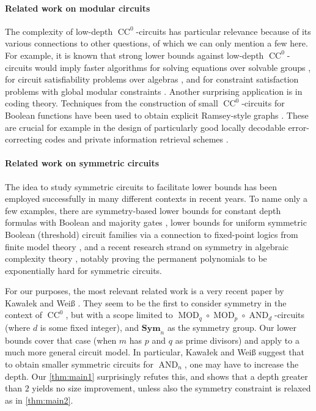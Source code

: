 \documentclass[11pt]{article}
\DeclareMathOperator{\MOD}{MOD}
\DeclareMathOperator{\AND}{AND}
\newcommand{\Sym}{\mathbf{Sym}}
\theoremstyle{definition}
\theoremstyle{plain}
\theoremstyle{remark}
\theoremstyle{remark}
\DeclareMathOperator{\CC}{CC}
\begin{document}
 







\paragraph*{Related work on modular circuits }
The complexity of low-depth $\CC^0$-circuits has particular relevance because of its various connections to other questions, of which we can only mention a few here.
For example, it is known that strong lower bounds against low-depth $\CC^0$-circuits would imply faster algorithms for solving equations over solvable groups \cite{IdziakKKW22-icalp}, for circuit satisfiability problems over algebras \cite{IdziakKK20, IdziakKK25}, and for constraint satisfaction problems with global modular constraints \cite{brakensiek2022}.
Another surprising application is in coding theory. Techniques from the construction of small $\CC^0$-circuits for Boolean functions have been used to obtain explicit Ramsey-style graphs \cite{Gopalan14, grolmusz2000}. These are crucial for example in the design of particularly good locally decodable error-correcting codes \cite{Efremenko12, zev11} and private information retrieval schemes \cite{zeev15}. 



\paragraph*{Related work on symmetric circuits}
The idea to study symmetric circuits to facilitate lower bounds has been employed successfully in many different contexts in recent years.
To name only a few examples, there are symmetry-based lower bounds for constant depth formulas with Boolean and majority gates \cite{HeR23}, lower bounds for uniform symmetric Boolean (threshold) circuit families via a connection to fixed-point logics from finite model theory \cite{anderson_symmetric_2017}, and a recent research strand on symmetry in algebraic complexity theory \cite{DawarW20, dawar2021lower, SymHomPolynomials, STOCpaper}, notably proving the permanent polynomials to be exponentially hard for symmetric circuits.

For our purposes, the most relevant related work is a very recent paper by Kawa\l ek and Weiß \cite{kawalekweiss25}. They seem to be the first to consider symmetry in the context of $\CC^0$, but with a scope limited to $\MOD_q \circ \MOD_p \circ \AND_d$-circuits (where $d$ is some fixed integer), and $\Sym_n$ as the symmetry group. 
Our lower bounds cover that case (when $m$ has $p$ and $q$ as prime divisors) and apply to a much more general circuit model. In particular, Kawa\l ek and Weiß suggest that to obtain smaller symmetric circuits for $\AND_n$, one may have to increase the depth. Our \cref{thm:main1} surprisingly refutes this, and shows that a depth greater than $2$ yields no size improvement, unless also the symmetry constraint is relaxed as in \cref{thm:main2}. 
 
\end{document}
